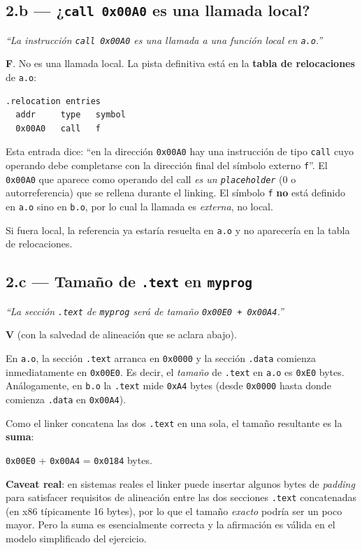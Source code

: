 \documentclass[11pt,a4paper]{article}
\begin{document}
\subsection*{2.b --- ¿\texttt{call 0x00A0} es una llamada local?}

\emph{``La instrucción \texttt{call 0x00A0} es una llamada a una
función local en \texttt{a.o}.''}

\begin{respuesta}
\textbf{F}. No es una llamada local. La pista definitiva está en la
\textbf{tabla de relocaciones} de \texttt{a.o}:

\begin{lstlisting}[style=textstyle]
.relocation entries
  addr     type   symbol
  0x00A0   call   f
\end{lstlisting}

Esta entrada dice: ``en la dirección \texttt{0x00A0} hay una
instrucción de tipo \texttt{call} cuyo operando debe completarse con
la dirección final del símbolo externo \texttt{f}''. El \texttt{0x00A0}
que aparece como operando del call \emph{es un \texttt{placeholder}}
(0 o autorreferencia) que se rellena durante el linking. El símbolo
\texttt{f} \textbf{no} está definido en \texttt{a.o} sino en
\texttt{b.o}, por lo cual la llamada es \emph{externa}, no local.

Si fuera local, la referencia ya estaría resuelta en \texttt{a.o} y
no aparecería en la tabla de relocaciones.
\end{respuesta}

\subsection*{2.c --- Tamaño de \texttt{.text} en \texttt{myprog}}

\emph{``La sección \texttt{.text} de \texttt{myprog} será de tamaño
\texttt{0x00E0 + 0x00A4}.''}

\begin{respuesta}
\textbf{V} (con la salvedad de alineación que se aclara abajo).

En \texttt{a.o}, la sección \texttt{.text} arranca en \texttt{0x0000}
y la sección \texttt{.data} comienza inmediatamente en \texttt{0x00E0}.
Es decir, el \emph{tamaño} de \texttt{.text} en \texttt{a.o} es
\texttt{0xE0} bytes. Análogamente, en \texttt{b.o} la \texttt{.text}
mide \texttt{0xA4} bytes (desde \texttt{0x0000} hasta donde comienza
\texttt{.data} en \texttt{0x00A4}).

Como el linker concatena las dos \texttt{.text} en una sola, el
tamaño resultante es la \textbf{suma}:

\quad \texttt{0x00E0} + \texttt{0x00A4} = \texttt{0x0184} bytes.

\textbf{Caveat real}: en sistemas reales el linker puede insertar
algunos bytes de \emph{padding} para satisfacer requisitos de
alineación entre las dos secciones \texttt{.text} concatenadas (en
x86 típicamente 16 bytes), por lo que el tamaño \emph{exacto} podría
ser un poco mayor. Pero la suma es esencialmente correcta y la
afirmación es válida en el modelo simplificado del ejercicio.
\end{respuesta}
\end{document}
